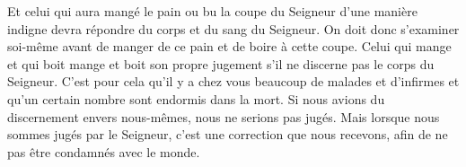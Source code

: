 Et celui qui aura mangé le pain ou bu la coupe du Seigneur d’une manière indigne
	devra répondre du corps et du sang du Seigneur.
On doit donc s’examiner soi-même avant de manger de ce pain et de boire à cette coupe.
Celui qui mange et qui boit mange et boit son propre jugement
	s’il ne discerne pas le corps du Seigneur.
C’est pour cela qu’il y a chez vous beaucoup de malades et d’infirmes
	et qu’un certain nombre sont endormis dans la mort.
Si nous avions du discernement envers nous-mêmes, nous ne serions pas jugés.
Mais lorsque nous sommes jugés par le Seigneur,
	c’est une correction que nous recevons, afin de ne pas être condamnés avec le monde.
